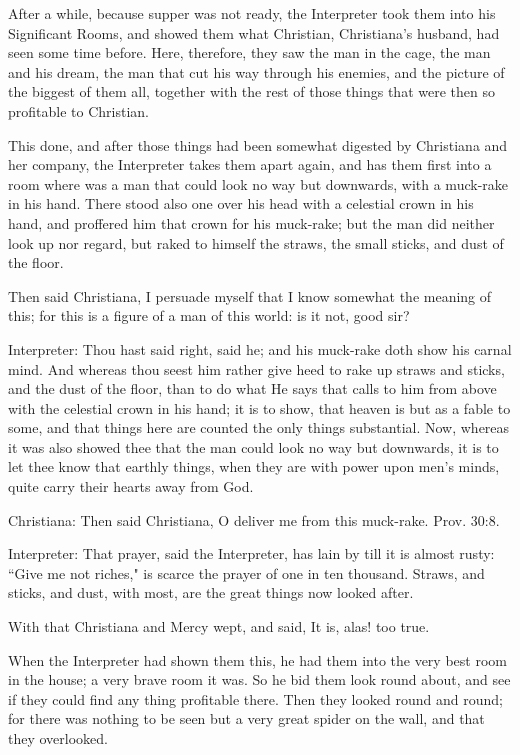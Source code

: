 After a while, because supper was not ready, the Interpreter took them into his Significant Rooms, and showed them what Christian, Christiana's husband, had seen some time before. Here, therefore, they saw the man in the cage, the man and his dream, the man that cut his way through his enemies, and the picture of the biggest of them all, together with the rest of those things that were then so profitable to Christian.

This done, and after those things had been somewhat digested by Christiana and her company, the Interpreter takes them apart again, and has them first into a room where was a man that could look no way but downwards, with a muck-rake in his hand. There stood also one over his head with a celestial crown in his hand, and proffered him that crown for his muck-rake; but the man did neither look up nor regard, but raked to himself the straws, the small sticks, and dust of the floor.

Then said Christiana, I persuade myself that I know somewhat the meaning of this; for this is a figure of a man of this world: is it not, good sir?

Interpreter: Thou hast said right, said he; and his muck-rake doth show his carnal mind. And whereas thou seest him rather give heed to rake up straws and sticks, and the dust of the floor, than to do what He says that calls to him from above with the celestial crown in his hand; it is to show, that heaven is but as a fable to some, and that things here are counted the only things substantial. Now, whereas it was also showed thee that the man could look no way but downwards, it is to let thee know that earthly things, when they are with power upon men's minds, quite carry their hearts away from God.

Christiana: Then said Christiana, O deliver me from this muck-rake. Prov. 30:8.

Interpreter: That prayer, said the Interpreter, has lain by till it is almost rusty: ``Give me not riches," is scarce the prayer of one in ten thousand. Straws, and sticks, and dust, with most, are the great things now looked after.

With that Christiana and Mercy wept, and said, It is, alas! too true.

When the Interpreter had shown them this, he had them into the very best room in the house; a very brave room it was. So he bid them look round about, and see if they could find any thing profitable there. Then they looked round and round; for there was nothing to be seen but a very great spider on the wall, and that they overlooked.

